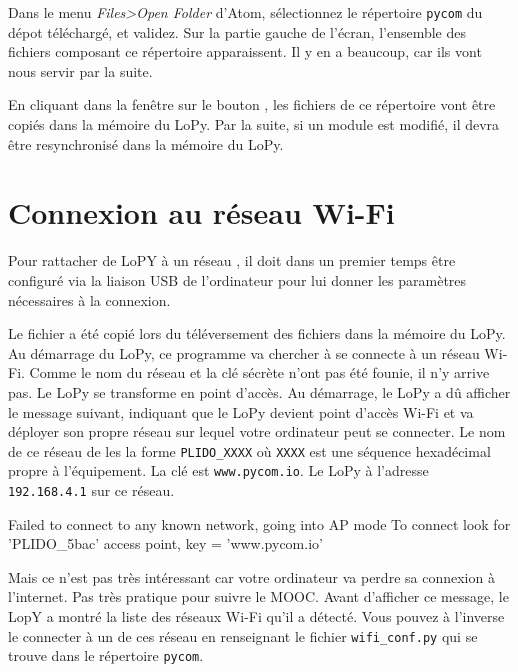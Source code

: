 Dans le menu \textit{Files>Open Folder} d’Atom, sélectionnez le répertoire \texttt{pycom} du dépot téléchargé, et validez. Sur la partie gauche de l’écran, l’ensemble des fichiers composant ce répertoire apparaissent. Il y en a beaucoup, car ils vont nous servir par la suite.

     \vspace{1em}

En cliquant dans la fenêtre \textit{} sur le bouton , les fichiers de ce répertoire vont être copiés dans la mémoire du LoPy. Par la suite, si un module est modifié, il devra être resynchronisé dans la mémoire du LoPy.

\section{Connexion au réseau Wi-Fi}

\begin{figure}
\end{figure}


Pour rattacher de LoPY à un réseau , il doit dans un premier temps être configuré via la liaison USB de l'ordinateur pour lui donner les paramètres nécessaires à la connexion. 


Le fichier \texttt{} a été copié lors du téléversement des fichiers dans la mémoire du LoPy. Au démarrage du LoPy, ce programme va chercher à se connecte à un réseau Wi-Fi. Comme le nom du réseau et la clé sécrète n'ont pas été founie, il n’y arrive pas. Le LoPy se transforme  en point d’accès. Au démarrage, le LoPy a dû afficher le message suivant, indiquant que le LoPy devient point d'accès Wi-Fi et va déployer son propre réseau sur lequel votre ordinateur peut se connecter. Le nom de ce réseau de les la forme \texttt{PLIDO\_XXXX} où \texttt{XXXX} est une séquence hexadécimal propre à l'équipement. La clé est \texttt{www.pycom.io}. Le LoPy à l'adresse \texttt{192.168.4.1} sur ce réseau.  

\begin{termc}[backgroundcolor=\color{gray!10}, language=json, basicstyle=\ttfamily\small, escapechar=@]
Failed to connect to any known network, going into AP mode
To connect look for 'PLIDO_5bac' access point, key = 'www.pycom.io'
\end{termc}

Mais ce n'est pas très intéressant car votre ordinateur va perdre sa connexion à l'internet. Pas très pratique pour suivre le MOOC. Avant d'afficher ce message, le LopY a montré la liste des réseaux Wi-Fi qu'il a détecté. Vous pouvez à l'inverse le connecter à un de ces réseau en renseignant le fichier \texttt{wifi\_conf.py} qui se trouve dans le répertoire \texttt{pycom}.


